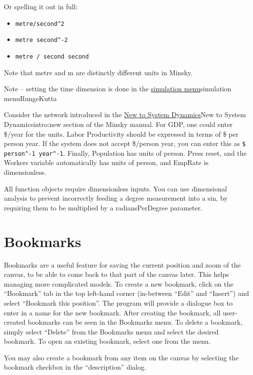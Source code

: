 Or spelling it out in full:

\begin{itemize}
\item \verb+metre/second^2+
\item \verb+metre second^-2+
\item \verb+metre / second second+
\end{itemize}

Note that metre and m are distinctly different units in Minsky.

Note -- setting the time dimension is done in the
\hyperref[ref]{simulation menu}{simulation menu}{}{RungeKutta}

Consider the network introduced in the \hyperref[ref]{New to System
  Dynamics}{New to System Dynamics}{}{intro:new} section of the Minsky
manual. For GDP, one could enter \$/year for the units. Labor
Productivity should be expressed in terms of \$ per person year. If
the system does not accept \$/person year, you can enter this as
\verb+$ person^-1 year^-1+.  Finally, Population has units of
person. Press reset, and the Workers variable automatically has units
of person, and EmpRate is dimensionless.

All function objects require dimensionless inputs. You can use
dimensional analysis to prevent incorrectly feeding a degree
measurement into a sin, by requiring them to be multiplied by a
radiansPerDegree parameter.

\section{Bookmarks}

Bookmarks are a useful feature for saving the current position and
zoom of the canvas, to be able to come back to that part of the canvas
later. This helps managing more complicated models.  To create a new
bookmark, click on the ``Bookmark'' tab in the top left-hand corner
(in-between ``Edit'' and ``Insert'') and select ``Bookmark this
position''. The program will provide a dialogue box to enter in a name
for the new bookmark. After creating the bookmark, all user-created
bookmarks can be seen in the Bookmarks menu. To delete a bookmark,
simply select ``Delete'' from the Bookmarks menu and select the
desired bookmark. To open an existing bookmark, select one from the
menu.

You may also create a bookmark from any item on the canvas by
selecting the bookmark checkbox in the ``description'' dialog.

